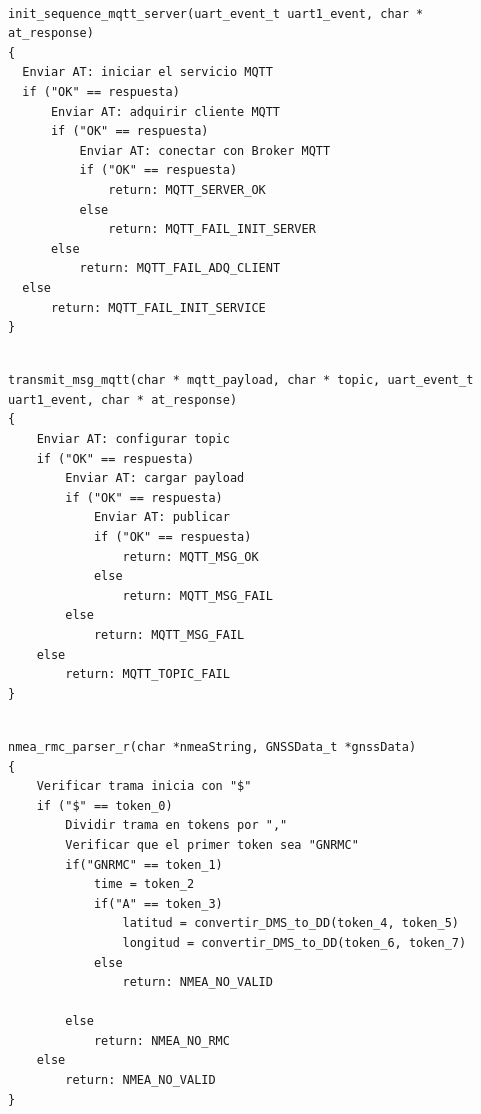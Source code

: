  


\begin{lstlisting}[label=cod:init_sequence_mqtt_server, caption=Pseudocódigo de la función init\_sequence\_mqtt\_server().] 

init_sequence_mqtt_server(uart_event_t uart1_event, char * at_response)
{
  Enviar AT: iniciar el servicio MQTT
  if ("OK" == respuesta)
      Enviar AT: adquirir cliente MQTT
      if ("OK" == respuesta)
          Enviar AT: conectar con Broker MQTT
	      if ("OK" == respuesta)
	          return: MQTT_SERVER_OK
	      else 
	          return: MQTT_FAIL_INIT_SERVER
      else
          return: MQTT_FAIL_ADQ_CLIENT
  else
      return: MQTT_FAIL_INIT_SERVICE	
}

\end{lstlisting}
 




\begin{lstlisting}[label=cod:transmit_msg_mqtt, caption=Pseudocódigo de la función init\_sequence\_mqtt\_server().] 

transmit_msg_mqtt(char * mqtt_payload, char * topic, uart_event_t uart1_event, char * at_response)
{
	Enviar AT: configurar topic
	if ("OK" == respuesta)
		Enviar AT: cargar payload
		if ("OK" == respuesta)
			Enviar AT: publicar
			if ("OK" == respuesta)
				return: MQTT_MSG_OK
			else
				return: MQTT_MSG_FAIL
		else
			return: MQTT_MSG_FAIL
	else
		return: MQTT_TOPIC_FAIL
}

\end{lstlisting}

 


\begin{lstlisting}[label=cod:nmea_rmc_parser_r, caption=Pseudocódigo de la función nmea\_rmc\_parser\_r().] 

nmea_rmc_parser_r(char *nmeaString, GNSSData_t *gnssData)
{
	Verificar trama inicia con "$"
	if ("$" == token_0)
		Dividir trama en tokens por ","
		Verificar que el primer token sea "GNRMC"
		if("GNRMC" == token_1)
			time = token_2 
			if("A" == token_3)
				latitud = convertir_DMS_to_DD(token_4, token_5)
				longitud = convertir_DMS_to_DD(token_6, token_7)
			else
				return: NMEA_NO_VALID			
			 
		else
			return: NMEA_NO_RMC
	else
		return: NMEA_NO_VALID
}

\end{lstlisting}




